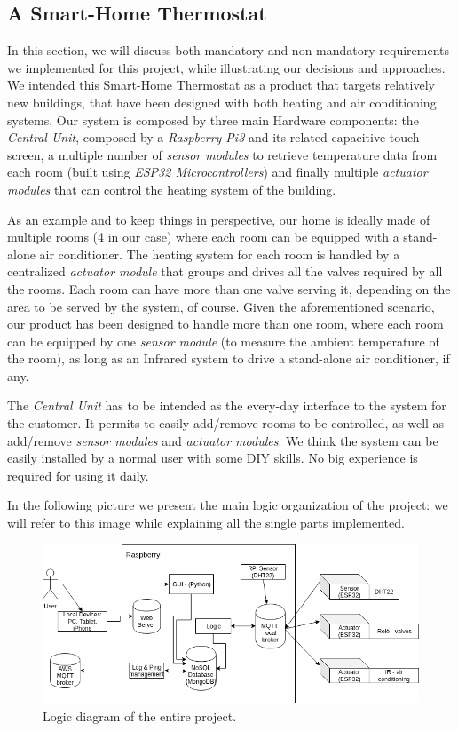 \documentclass[a4paper]{article}
\begin{document}
        \subsection{A Smart-Home Thermostat}
        In this section, we will discuss both mandatory and non-mandatory requirements we implemented for this project, while illustrating our decisions and approaches.
        We intended this Smart-Home Thermostat as a product that targets relatively new buildings, that have been designed with both heating and air conditioning systems.
        Our system is composed by three main Hardware components: the \emph{Central Unit}, composed by a \emph{Raspberry Pi3} and its related capacitive touch-screen, a multiple number of \emph{sensor modules} to retrieve temperature data from each room (built using \emph{ESP32 Microcontrollers}) and finally multiple \emph{actuator modules} that can control the heating system of the building.

        As an example and to keep things in perspective, our home is ideally made of multiple rooms (4 in our case) where each room can be equipped with a stand-alone air conditioner. The heating system for each room is handled by a centralized \emph{actuator module} that groups and drives all the valves required by all the rooms. Each room can have more than one valve serving it, depending on the area to be served by the system, of course.
        Given the aforementioned scenario, our product has been designed to handle more than one room, where each room can be equipped by one \emph{sensor module} (to measure the ambient temperature of the room), as long as an Infrared system to drive a stand-alone air conditioner, if any.

        The \emph{Central Unit} has to be intended as the every-day interface to the system for the customer. It permits to easily add/remove rooms to be controlled, as well as add/remove \emph{sensor modules} and \emph{actuator modules}. We think the system can be easily installed by a normal user with some DIY skills. No big experience is required for using it daily.

        In the following picture we present the main logic organization of the project: we will refer to this image while explaining all the single parts implemented.

        \begin{figure}[htp]
            \centering
            \includegraphics[width=1 \columnwidth]{./Diagram.png}
            \caption{
                    \label{fig:diagram}
                    Logic diagram of the entire project.
            }
        \end{figure}
\end{document}
